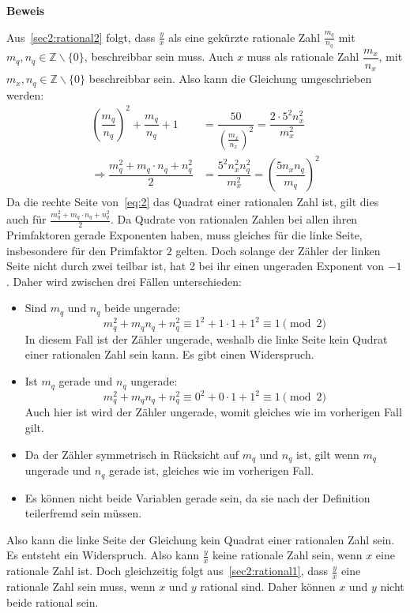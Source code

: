 \documentclass[10pt, a4paper]{amsart}
\makeatletter
\renewcommand\proofname{Beweis}
\renewenvironment{proof}[1][\proofname]{\par
\pushQED{\qed}%
\normalfont \topsep6\p@\@plus6\p@\relax
\trivlist
\item\relax
{\bfseries#1}\hspace\labelsep\ignorespaces
}{%
\popQED\endtrivlist\@endpefalse
}
\makeatother
\begin{document}
\begin{proof}
  Aus~\autoref{sec2:rational2} folgt, dass $\frac{y}{x}$ als eine gekürzte
  rationale Zahl $\frac{m_q}{n_q}$ mit $m_q,n_q\in\mathbb{Z}\backslash\{0\}$,
  beschreibbar sein muss. Auch $x$ muss
  als rationale Zahl $\dfrac{m_x}{n_x}$, mit
  $m_x,n_q\in\mathbb{Z}\backslash\{0\}$ beschreibbar sein.
  Also kann die Gleichung umgeschrieben werden:
  \begin{equation}
    \label{eq:2}
    \begin{split}
      \left(\dfrac{m_q}{n_q}\right)^2+\dfrac{m_q}{n_q}+1&=\dfrac{50}{\left(\frac{m_x}{n_x}\right)^2}=\dfrac{2\cdot 5^2n_x^2}{m_x^2}\\
      \Rightarrow \dfrac{m_q^2+m_q\cdot n_q +
        n_q^2}{2}&=\dfrac{5^2n_x^2n_q^2}{m_x^2}=\left( \dfrac{5n_xn_q}{m_q}
      \right)^2
    \end{split}
  \end{equation}
  Da die rechte Seite von~\eqref{eq:2} das Quadrat einer rationalen Zahl ist,
  gilt dies auch für $\frac{m_q^2+m_q\cdot n_q + n_q^2}{2}$. Da Qudrate von
  rationalen Zahlen bei allen ihren Primfaktoren gerade Exponenten haben, muss
  gleiches für die linke Seite, insbesondere für den Primfaktor $2$ gelten. Doch
  solange der Zähler der linken Seite nicht durch zwei teilbar ist, hat 2 bei
  ihr einen ungeraden Exponent von $-1$. Daher wird zwischen drei Fällen unterschieden:
  \begin{itemize}[itemsep=2ex]
  \item Sind $m_q$ und $n_q$ beide ungerade:
    \[m_q^2+m_qn_q+n_q^2\equiv1^2+1\cdot1+1^2\equiv1\pmod{2}\] In
    diesem Fall ist der Zähler ungerade, weshalb die
    linke Seite kein Qudrat einer rationalen Zahl sein kann. Es gibt einen
    Widerspruch.
  \item Ist $m_q$ gerade und $n_q$ ungerade:
    \[m_q^2+m_qn_q+n_q^2\equiv0^2+0\cdot1+1^2\equiv1\pmod{2}\] Auch hier ist
    wird der Zähler ungerade, womit gleiches wie im vorherigen Fall gilt.
  \item Da der Zähler symmetrisch in Rücksicht auf $m_q$ und $n_q$ ist, gilt
    wenn $m_q$ ungerade und $n_q$ gerade ist, gleiches wie im vorherigen
    Fall.
  \item Es können nicht beide Variablen gerade sein, da sie nach der Definition teilerfremd sein müssen.
  \end{itemize}
  Also kann die linke Seite der Gleichung kein Quadrat einer rationalen Zahl
  sein. Es entsteht ein Widerspruch. Also kann $\frac{y}{x}$ keine rationale Zahl sein, wenn $x$ eine rationale
  Zahl ist. Doch gleichzeitig folgt aus~\autoref{sec2:rational1}, dass
  $\frac{y}{x}$ eine rationale Zahl sein muss, wenn $x$ und $y$ rational sind.
  Daher können $x$ und $y$ nicht beide rational sein.
\end{proof}
\end{document}
